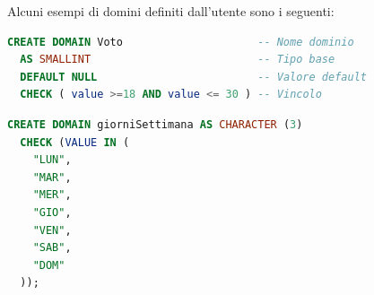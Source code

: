 \documentclass[a4paper]{article}
\begin{document}
\begin{example}
  Alcuni esempi di domini definiti dall'utente sono i seguenti:

\begin{lstlisting}[language=SQL]
CREATE DOMAIN Voto                     -- Nome dominio
  AS SMALLINT                          -- Tipo base
  DEFAULT NULL                         -- Valore default
  CHECK ( value >=18 AND value <= 30 ) -- Vincolo
\end{lstlisting}

\begin{lstlisting}[language=SQL]
CREATE DOMAIN giorniSettimana AS CHARACTER (3)
  CHECK (VALUE IN (
    "LUN",
    "MAR",
    "MER",
    "GIO",
    "VEN",
    "SAB",
    "DOM"
  ));
\end{lstlisting}
\vspace{1em}
\noindent

\end{example}
\end{document}

